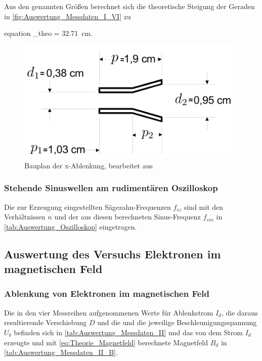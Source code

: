 		Aus den genannten Größen berechnet sich die theoretische Steigung der 
		Geraden in \cref{fig:Auswertung_Messdaten_I_VI} zu
		\begin{empheq}{equation}
			\label{eq:Auswertung_Ergebnis_I_theo} 
			\alpha_{theo} = \SI{32.71}{\centi\meter}.
		\end{empheq}	
		\begin{figure}[!h]
			\centering
			\includegraphics[scale=0.7]{Grafiken/Bauplan.PNG}
			\caption{Bauplan der x-Ablenkung, bearbeitet aus \cite{V501}}\label{fig:Auswertung_Bauplan}
		\end{figure}
		
	\subsubsection{Stehende Sinuswellen am rudimentären Oszilloskop}

		Die zur Erzeugung eingestellten Sägezahn-Frequenzen $f_{sz}$ sind
		mit den Verhältnissen $n$ und der aus diesen berechneten Sinus-Frequenz
		$f_{sin}$ in \cref{tab:Auswertung_Oszilloskop} eingetragen.
		
		 
		
\subsection{Auswertung des Versuchs Elektronen im magnetischen Feld}

	\subsubsection{Ablenkung von Elektronen im magnetischen Feld}
	
		Die in den vier Messreihen aufgenommenen Werte für Ablenkstrom $I_{d}$,
		die daraus resultierende Verschiebung $D$ und die und die jeweilige 
		Beschleunigungsspannung $U_{b}$ befinden sich in 
		\cref{tab:Auswertung_Messdaten_II} und das von dem Strom $I_{d}$ 
		erzeugte und mit \cref{eq:Theorie_Magnetfeld} berechnete Magnetfeld $B_{d}$ in \cref{tab:Auswertung_Messdaten_II_B}.
		
